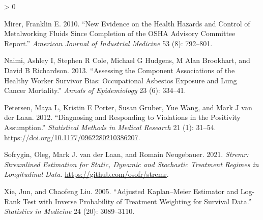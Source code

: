 \documentclass[
  11pt,
]{article}
\newlength{\cslhangindent}
\newenvironment{CSLReferences}[2] %
 {%
  \setlength{\parindent}{0pt}
  \ifodd #1 \everypar{\setlength{\hangindent}{\cslhangindent}}\ignorespaces\fi
  \ifnum #2 > 0
  \setlength{\parskip}{#2\baselineskip}
  \fi
 }%
 {}
\begin{document}
\begin{CSLReferences}{1}{0}
\leavevmode\hypertarget{ref-Mirer_2010}{}%
Mirer, Franklin E. 2010. {``New Evidence on the Health Hazards and
Control of Metalworking Fluids Since Completion of the OSHA Advisory
Committee Report.''} \emph{American Journal of Industrial Medicine} 53
(8): 792--801.

\leavevmode\hypertarget{ref-Naimi_2013}{}%
Naimi, Ashley I, Stephen R Cole, Michael G Hudgens, M Alan Brookhart,
and David B Richardson. 2013. {``Assessing the Component Associations of
the Healthy Worker Survivor Bias: Occupational Asbestos Exposure and
Lung Cancer Mortality.''} \emph{Annals of Epidemiology} 23 (6): 334--41.

\leavevmode\hypertarget{ref-Petersen_2012}{}%
Petersen, Maya L, Kristin E Porter, Susan Gruber, Yue Wang, and Mark J
van der Laan. 2012. {``Diagnosing and Responding to Violations in the
Positivity Assumption.''} \emph{Statistical Methods in Medical Research}
21 (1): 31--54. \url{https://doi.org/10.1177/0962280210386207}.

\leavevmode\hypertarget{ref-Sofrygin_2021}{}%
Sofrygin, Oleg, Mark J. van der Laan, and Romain Neugebauer. 2021.
\emph{Stremr: Streamlined Estimation for Static, Dynamic and Stochastic
Treatment Regimes in Longitudinal Data}.
\url{https://github.com/osofr/stremr}.

\leavevmode\hypertarget{ref-Xie_2005}{}%
Xie, Jun, and Chaofeng Liu. 2005. {``Adjusted Kaplan--Meier Estimator
and Log-Rank Test with Inverse Probability of Treatment Weighting for
Survival Data.''} \emph{Statistics in Medicine} 24 (20): 3089--3110.

\end{CSLReferences}
\end{document}
